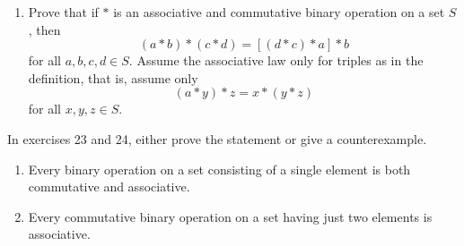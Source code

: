 \documentclass[10pt,letterpaper]{article}
\begin{document}
  \begin{enumerate}[resume]
    \item Prove that if $*$ is an associative and commutative binary operation on a set $S$, then 
    \[ (a\ast b)\ast (c \ast d)=[(d \ast c) \ast a] \ast b \] 
    for all $a, b,c,d \in S$. Assume the associative law only for triples as in the definition,
    that is, assume only \[ (a * y)*z= x*(y*z) \] for all $x, y,z \in S$.
  \end{enumerate}

\noindent In exercises 23 and 24, either prove the statement or give a counterexample.
  \begin{enumerate}[resume]
    \item Every binary operation on a set consisting of a single element is both commutative and associative.
    \item Every commutative binary operation on a set having just two elements is associative.
  \end{enumerate}
\end{document}
